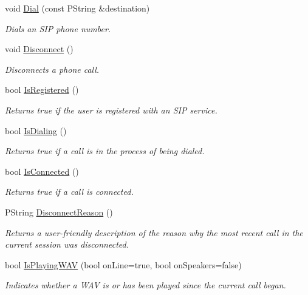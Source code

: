 \begin{CompactItemize}
void \hyperlink{classTeleKarma_2fe3ca9129b35b8543a1ecdb88740e3d}{Dial} (const PString \&destination)
\begin{CompactList}\small\item\em Dials an SIP phone number. \item\end{CompactList}\item 
void \hyperlink{classTeleKarma_318d959306b0c1e5a39c531be100387c}{Disconnect} ()
\begin{CompactList}\small\item\em Disconnects a phone call. \item\end{CompactList}\item 
bool \hyperlink{classTeleKarma_ac8cc89975dcba9feefeb0f79684836e}{IsRegistered} ()
\begin{CompactList}\small\item\em Returns true if the user is registered with an SIP service. \item\end{CompactList}\item 
bool \hyperlink{classTeleKarma_4c060e114d5e1d4f7ec2b4532a843443}{IsDialing} ()
\begin{CompactList}\small\item\em Returns true if a call is in the process of being dialed. \item\end{CompactList}\item 
bool \hyperlink{classTeleKarma_d971a263dc085039322afa915a6ff350}{IsConnected} ()
\begin{CompactList}\small\item\em Returns true if a call is connected. \item\end{CompactList}\item 
PString \hyperlink{classTeleKarma_be2a73dfd1cdae97ef435325ab74c7db}{DisconnectReason} ()
\begin{CompactList}\small\item\em Returns a user-friendly description of the reason why the most recent call in the current session was disconnected. \item\end{CompactList}\item 
bool \hyperlink{classTeleKarma_4b4ffc065dbc11f5b0afa9ba30c9620d}{IsPlayingWAV} (bool onLine=true, bool onSpeakers=false)
\begin{CompactList}\small\item\em Indicates whether a WAV is or has been played since the current call began. \item\end{CompactList}\item 

\end{CompactItemize}
